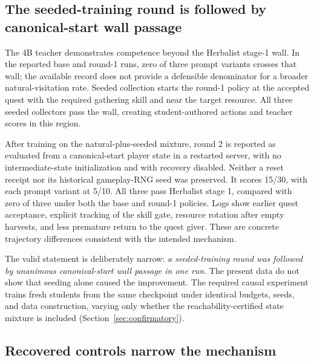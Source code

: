 \documentclass[11pt,a4paper]{article}
\begin{document}
\subsection{The seeded-training round is followed by canonical-start wall passage}

The 4B teacher demonstrates competence beyond the Herbalist stage-1 wall. In the
reported base and round-1 runs, zero of three prompt variants crosses that wall;
the available record does not provide a defensible denominator for a broader
natural-visitation rate. Seeded collection
starts the round-1 policy at the accepted quest with the required gathering
skill and near the target resource. All three seeded collectors pass the wall,
creating student-authored actions and teacher scores in this region.

After training on the natural-plus-seeded mixture, round 2 is reported as
evaluated from a canonical-start player state in a restarted server, with no
intermediate-state initialization and with recovery disabled. Neither a reset
receipt nor its historical gameplay-RNG seed was preserved. It scores 15/30, with each prompt
variant at 5/10. All three pass Herbalist stage 1, compared with zero of three
under both the base and round-1 policies. Logs show earlier quest acceptance,
explicit tracking of the skill gate, resource rotation after empty harvests,
and less premature return to the quest giver. These are concrete trajectory
differences consistent with the intended mechanism.

The valid statement is deliberately narrow: \emph{a seeded-training round was
followed by unanimous canonical-start wall passage in one run}. The present data do not
show that seeding alone caused the improvement. The required causal experiment
trains fresh students from the same checkpoint under identical budgets, seeds,
and data construction, varying only whether the reachability-certified state mixture is
included (Section~\ref{sec:confirmatory}).

\subsection{Recovered controls narrow the mechanism}
\end{document}
